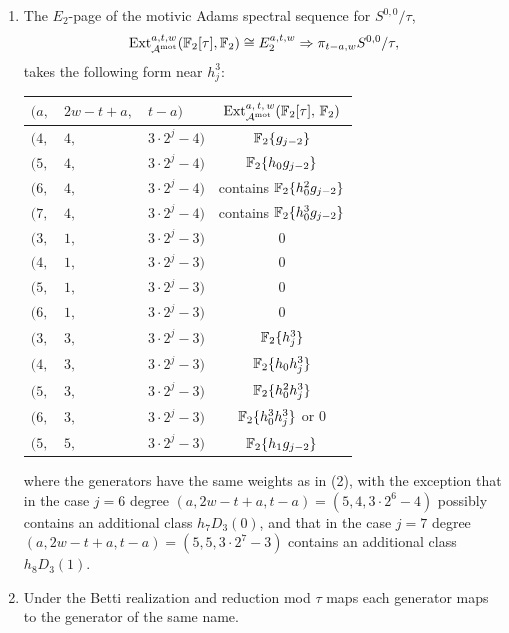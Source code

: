 \begin{thm}
\begin{enumerate}
  \item The $E_2$-page of the motivic Adams spectral sequence for $S^{0,0}/\tau$, 
    $$\operatorname{\mathrm{Ext}}^{a,t,w}_{\operatorname{\mathcal{A}}^\textup{mot}}(\mathbb{F}_2[\tau], \mathbb{F}_2) \cong E_2^{a,t,w} \Rightarrow \pi_{t-a, w}S^{0,0}/\tau,$$
    takes the following form near $h_j^3$:
    \begin{center}{\renewcommand{\arraystretch}{1.2}
        \begin{tabular}{|lll|c|}\hline
          $(a,$ & $2w-t+a,$ & $t-a)$ & $\operatorname{\mathrm{Ext}}^{a,\,t,\,w}_{\operatorname{\mathcal{A}}^\textup{mot}}(\mathbb{F}_2[\tau],\, \mathbb{F}_2)$ \\\hline\hline
          $(4,$ & $4,$ & $ 3 \cdot 2^j-4)$ & $\operatorname{\mathbb{F}}_2\{g_{j-2}\}$ \\\hline
          $(5,$ & $4,$ & $ 3 \cdot 2^j-4)$ & $\operatorname{\mathbb{F}}_2\{h_0g_{j-2}\} $ \\\hline
          $(6,$ & $4,$ & $ 3 \cdot 2^j-4)$ & contains $\operatorname{\mathbb{F}}_2\{h_0^2g_{j-2}\} $ \\\hline
          $(7,$ & $4,$ & $ 3 \cdot 2^j-4)$ & contains $\operatorname{\mathbb{F}}_2\{h_0^3g_{j-2}\} $ \\\hline
          $(3,$ & $1,$ & $ 3 \cdot 2^j-3)$ & $0$ \\\hline
          $(4,$ & $1,$ & $ 3 \cdot 2^j-3)$ & $0$ \\\hline
          $(5,$ & $1,$ & $ 3 \cdot 2^j-3)$ & $0$ \\\hline
          $(6,$ & $1,$ & $ 3 \cdot 2^j-3)$ & $0$ \\\hline          
          $(3,$ & $3,$ & $ 3 \cdot 2^j-3)$ & $\operatorname{\mathbb{F}}_2\{h_j^3\}$ \\\hline
          $(4,$ & $3,$ & $ 3 \cdot 2^j-3)$ & $\operatorname{\mathbb{F}}_2\{h_0h_j^3\}$ \\\hline
          $(5,$ & $3,$ & $ 3 \cdot 2^j-3)$ & $\operatorname{\mathbb{F}}_2\{h_0^2h_j^3\}$ \\\hline    
          $(6,$ & $3,$ & $ 3 \cdot 2^j-3)$ & $\operatorname{\mathbb{F}}_2\{h_0^3h_j^3\}$ or $0$ \\\hline
          $(5,$ & $5,$ & $ 3 \cdot 2^j-3)$ & $\operatorname{\mathbb{F}}_2\{h_1g_{j-2}\}$ \\\hline          
        \end{tabular}}
    \end{center}
    where the generators have the same weights as in (2), with the exception that
    in the case $j=6$ degree $(a,2w-t+a,t-a)=(5,4,3 \cdot 2^{6} - 4)$ possibly contains an additional class $h_7D_3(0)$, and that
    in the case $j=7$ degree $(a,2w-t+a,t-a)=(5,5,3 \cdot 2^{7} - 3)$ contains an additional class $h_8D_3(1)$.

  \item Under the Betti realization and reduction mod $\tau$ maps each generator maps to the generator of the same name.
  \end{enumerate}
\end{thm}

